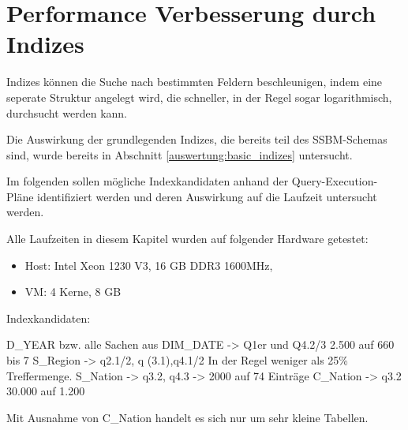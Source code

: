 \chapter{Performance Verbesserung durch Indizes}

Indizes können die Suche nach bestimmten Feldern beschleunigen, indem eine seperate Struktur angelegt wird, die schneller, in der Regel sogar logarithmisch, durchsucht werden kann.

Die Auswirkung der grundlegenden Indizes, die bereits teil des SSBM-Schemas sind, wurde bereits in Abschnitt \ref{auswertung:basic_indizes} untersucht. 

Im folgenden sollen mögliche Indexkandidaten anhand der Query-Execution-Pläne identifiziert werden und deren Auswirkung auf die Laufzeit untersucht werden.

Alle Laufzeiten in diesem Kapitel wurden auf folgender Hardware getestet:
\begin{itemize}
    \item Host: Intel Xeon 1230 V3, 16 GB DDR3 1600MHz, 
    \item VM: 4 Kerne, 8 GB
\end{itemize}


Indexkandidaten:

D_YEAR bzw. alle Sachen aus DIM_DATE -> Q1er und Q4.2/3 2.500 auf 660 bis 7
S_Region -> q2.1/2, q (3.1),q4.1/2 In der Regel weniger als 25\% Treffermenge.
S_Nation -> q3.2, q4.3 -> 2000 auf 74 Einträge
C_Nation -> q3.2 30.000 auf 1.200

Mit Ausnahme von C_Nation handelt es sich nur um sehr kleine Tabellen.




